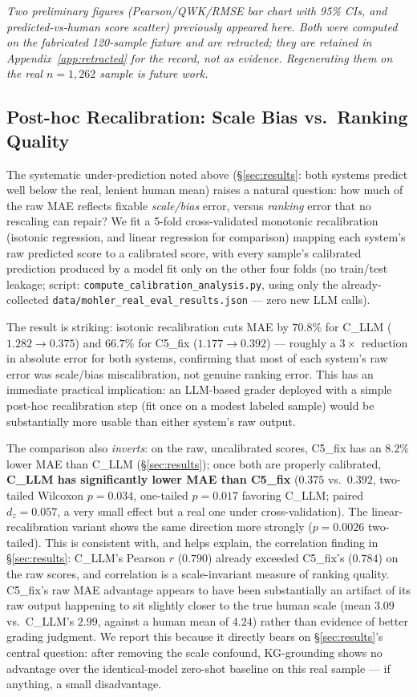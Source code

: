 \documentclass[conference]{IEEEtran}
\begin{document}
\textit{Two preliminary figures (Pearson/QWK/RMSE bar chart with 95\%
CIs, and predicted-vs-human score scatter) previously appeared here.
Both were computed on the fabricated 120-sample fixture and are
retracted; they are retained in Appendix~\ref{app:retracted} for the
record, not as evidence. Regenerating them on the real $n=1{,}262$
sample is future work.}


\subsection{Post-hoc Recalibration: Scale Bias vs.\ Ranking Quality}
\label{subsec:calibration}

The systematic under-prediction noted above (\S\ref{sec:results}: both
systems predict well below the real, lenient human mean) raises a
natural question: how much of the raw MAE reflects fixable
\emph{scale/bias} error, versus \emph{ranking} error that no rescaling
can repair? We fit a 5-fold cross-validated monotonic recalibration
(isotonic regression, and linear regression for comparison) mapping each
system's raw predicted score to a calibrated score, with every sample's
calibrated prediction produced by a model fit only on the other four
folds (no train/test leakage; script:
\texttt{compute\_calibration\_analysis.py}, using only the already-collected
\texttt{data/mohler\_real\_eval\_results.json} --- zero new LLM calls).

The result is striking: isotonic recalibration cuts MAE by
$70.8\%$ for C\_LLM ($1.282 \to 0.375$) and $66.7\%$ for C5\_fix
($1.177 \to 0.392$) --- roughly a $3\times$ reduction in absolute error
for both systems, confirming that most of each system's raw error was
scale/bias miscalibration, not genuine ranking error. This has an
immediate practical implication: an LLM-based grader deployed with a
simple post-hoc recalibration step (fit once on a modest labeled sample)
would be substantially more usable than either system's raw output.

The comparison also \emph{inverts}: on the raw, uncalibrated scores,
C5\_fix has an $8.2\%$ lower MAE than C\_LLM (\S\ref{sec:results}); once
both are properly calibrated, \textbf{C\_LLM has significantly lower MAE
than C5\_fix} ($0.375$ vs.\ $0.392$, two-tailed Wilcoxon $p=0.034$,
one-tailed $p=0.017$ favoring C\_LLM; paired $d_z=0.057$, a very small
effect but a real one under cross-validation). The linear-recalibration
variant shows the same direction more strongly ($p=0.0026$ two-tailed).
This is consistent with, and helps explain, the correlation finding in
\S\ref{sec:results}: C\_LLM's Pearson $r$ ($0.790$) already exceeded
C5\_fix's ($0.784$) on the raw scores, and correlation is a scale-invariant
measure of ranking quality. C5\_fix's raw MAE advantage appears to have
been substantially an artifact of its raw output happening to sit
slightly closer to the true human scale (mean $3.09$ vs.\ C\_LLM's
$2.99$, against a human mean of $4.24$) rather than evidence of better
grading judgment. We report this because it directly bears on
\S\ref{sec:results}'s central question: after removing the scale
confound, KG-grounding shows no advantage over the identical-model
zero-shot baseline on this real sample --- if anything, a small
disadvantage.
\end{document}
